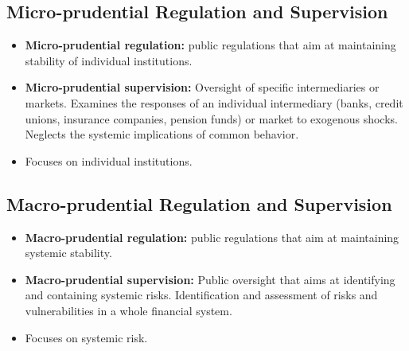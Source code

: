 \subsection{Micro-prudential Regulation and Supervision}
\begin{itemize}
    \item \textbf{Micro-prudential regulation:} public regulations that aim at maintaining stability of individual institutions.
    \item \textbf{Micro-prudential supervision:} Oversight of specific intermediaries or markets. Examines the responses of an individual intermediary (banks, credit unions, insurance companies, pension funds) or market to exogenous shocks. Neglects the systemic implications of common behavior.
    \item Focuses on individual institutions.
\end{itemize}

\subsection{Macro-prudential Regulation and Supervision}
\begin{itemize}
    \item \textbf{Macro-prudential regulation:} public regulations that aim at maintaining systemic stability.
    \item \textbf{Macro-prudential supervision:} Public oversight that aims at identifying and containing systemic risks. Identification and assessment of risks and vulnerabilities in a whole financial system.
    \item Focuses on systemic risk.
\end{itemize}
